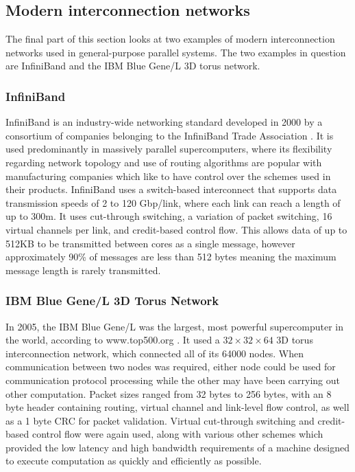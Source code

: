 \documentclass[a4paper, 12pt]{article}
\begin{document}
\subsection{Modern interconnection networks}

The final part of this section looks at two examples of modern interconnection networks used in general-purpose parallel systems. The two examples in question are InfiniBand and the IBM Blue Gene/L 3D torus network.

\subsubsection{InfiniBand}

InfiniBand is an industry-wide networking standard developed in 2000 by a consortium of companies belonging to the InfiniBand Trade Association \cite{Hen11}. It is used predominantly in massively parallel supercomputers, where its flexibility regarding network topology and use of routing algorithms are popular with manufacturing companies which like to have control over the schemes used in their products. InfiniBand uses a switch-based interconnect that supports data transmission speeds of 2 to 120 Gbp/link, where each link can reach a length of up to 300m. It uses cut-through switching, a variation of packet switching, 16 virtual channels per link, and credit-based control flow. This allows data of up to 512KB to be transmitted between cores as a single message, however approximately 90\% of messages are less than 512 bytes meaning the maximum message length is rarely transmitted. 

\subsubsection{IBM Blue Gene/L 3D Torus Network}

In 2005, the IBM Blue Gene/L was the largest, most powerful supercomputer in the world, according to www.top500.org \cite{Hen11}. It used a $32 \times 32 \times 64$ 3D torus interconnection network, which connected all of its 64000 nodes. When communication between two nodes was required, either node could be used for  communication protocol processing while the other may have been carrying out other computation. Packet sizes ranged from 32 bytes to 256 bytes, with an 8 byte header containing routing, virtual channel and link-level flow control, as well as a 1 byte CRC for packet validation. Virtual cut-through switching and credit-based control flow were again used, along with various other schemes which provided the low latency and high bandwidth requirements of a machine designed to execute computation as quickly and efficiently as possible.
\end{document}
